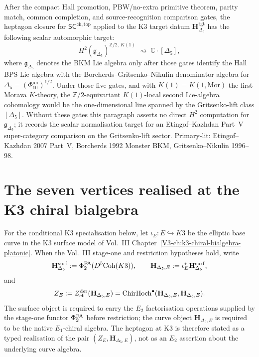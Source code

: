 \begin{remark}
\label{rem:schtop-heptagon-2}
After the compact Hall promotion, PBW/no-extra primitive theorem, parity
match, common completion, and source-recognition comparison gates, the
heptagon closure for $\mathsf{SC}^{\mathrm{ch,top}}$ applied to the K3
target datum $\mathbf H_{\Delta_5}^{\mathrm{tgt}}$ has the following
scalar automorphic target:
\[
H^2(\mathfrak g_{\Delta_5})^{\mathbb Z/2,\,K(1)}
\;\rightsquigarrow\; \mathbb C\cdot[\Delta_5],
\]
where $\mathfrak g_{\Delta_5}$ denotes the BKM Lie algebra only after
those gates identify the Hall BPS Lie algebra with the
Borcherds--Gritsenko--Nikulin denominator algebra for
$\Delta_5=(\Phi_{10}^{\mathrm{un}})^{1/2}$. Under those five gates,
and with $K(1)=K(1,\mathrm{Mor})$ the first Morava $K$-theory, the
$\mathbb Z/2$-equivariant $K(1)$-local second Lie-algebra cohomology
would be the one-dimensional line spanned by the Gritsenko-lift class
$[\Delta_5]$. Without these gates this paragraph asserts no direct
$H^2$ computation for $\mathfrak g_{\Delta_5}$; it records the scalar
normalisation target for an Etingof--Kazhdan Part~V super-category
comparison on the Gritsenko-lift sector. Primary-lit:
Etingof--Kazhdan 2007 Part~V, Borcherds 1992 Monster BKM,
Gritsenko--Nikulin 1996--98.
\end{remark}

\section{The seven vertices realised at the K3 chiral bialgebra}
\label{sec:heptagon-K3-realisation}

For the conditional K3 specialisation below, let
$\iota_E\colon E\hookrightarrow K3$ be the elliptic base curve in the
K3 surface model of Vol.~III
Chapter~\ref{V3-ch:k3-chiral-bialgebra-platonic}. When the Vol.~III
stage-one and restriction hypotheses hold, write
\[
 \mathbf H_{\Delta_5}^{\mathrm{surf}}
 := \Phi^{\mathrm{FA}}_2(D^b\mathrm{Coh}(K3)),
 \qquad
 \mathbf H_{\Delta_5,E}:=\iota_E^*\mathbf H_{\Delta_5}^{\mathrm{surf}},
\]
and
\[
 Z_E :=
 Z^{\mathrm{der}}_{\mathrm{ch}}(\mathbf H_{\Delta_5,E})
 =
 \mathrm{ChirHoch}^\bullet(\mathbf H_{\Delta_5,E},\mathbf H_{\Delta_5,E}).
\]
The surface object is required to carry the $E_2$ factorisation
operations supplied by the stage-one functor $\Phi^{\mathrm{FA}}_2$ before
restriction; the curve object $\mathbf H_{\Delta_5,E}$ is required to
be the native $E_1$-chiral algebra. The heptagon at K3 is therefore
stated as a typed realisation of the pair
$(Z_E,\mathbf H_{\Delta_5,E})$, not as an $E_2$ assertion about the
underlying curve algebra.

